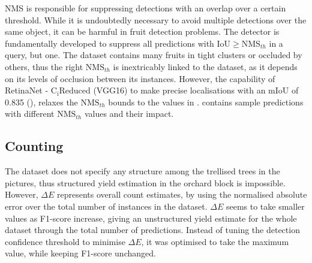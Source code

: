 NMS is responsible for suppressing detections with an overlap over a certain threshold. While it is undoubtedly necessary to avoid multiple detections over the same object, it can be harmful in fruit detection problems. The detector is fundamentally developed to suppress all predictions with $\text{IoU}\geq\text{NMS}_{th}$ in a query, but one. The dataset contains many fruits in tight clusters or occluded by others, thus the right $\text{NMS}_{th}$ is inextricably linked to the dataset, as it depends on its levels of occlusion between its instances. However, the capability of RetinaNet - $\text{C}_\text{i}\text{Reduced}$ (VGG16) to make precise localisations with an mIoU of 0.835 (), relaxes the $\text{NMS}_{th}$ bounds to the values in .  contains sample predictions with different $\text{NMS}_{th}$ values and their impact.

\subsection{Counting}
The dataset does not specify any structure among the trellised trees in the pictures, thus structured yield estimation in the orchard block is impossible. However, $\Delta E$ represents overall count estimates, by using the normalised absolute error over the total number of instances in the dataset. $\Delta E$ seems to take smaller values as F1-score increase, giving an unstructured yield estimate for the whole dataset through the total number of predictions. Instead of tuning the detection confidence threshold to minimise $\Delta E$, it was optimised to take the maximum value, while keeping F1-score unchanged.
